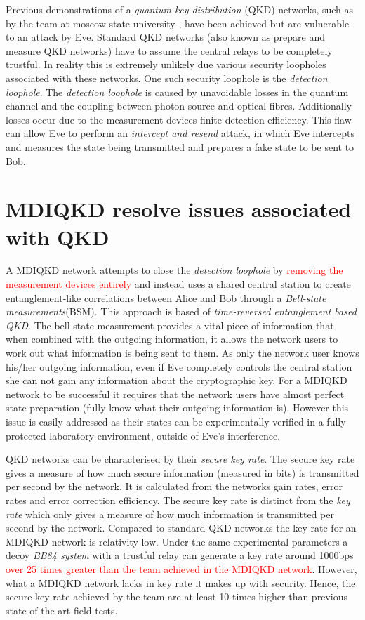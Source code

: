 \documentclass[journal]{vgtc}
\begin{document}
\noindent Previous demonstrations of a \textit{quantum key distribution} (QKD) networks, such as by the team at moscow state university\cite{2017QuEle..47..798K} , have been achieved but are vulnerable to an attack by Eve. Standard QKD networks (also known as prepare and measure QKD networks) have to assume the central relays to be completely trustful. In reality this is extremely unlikely due various security loopholes associated with these networks. One such security loophole is the \textit{detection loophole}. The \textit{detection loophole} is caused by unavoidable losses in the quantum channel and  the coupling between photon source and optical fibres. Additionally losses occur due to the measurement devices finite detection efficiency. This flaw can allow Eve to perform an \textit{intercept and resend} attack, in which Eve intercepts and measures the state being transmitted and prepares a fake state to be sent to Bob.

\section{MDIQKD resolve issues associated with QKD}


A MDIQKD network attempts to close the \textit{detection loophole} by \textcolor{red}{removing the measurement devices entirely} and instead uses a shared  central station to create entanglement-like correlations between Alice and Bob through a \textit{Bell-state measurements}(BSM). This approach is based of \textit{time-reversed entanglement based QKD}\cite{PhysRevA.54.2651}. The bell state measurement provides a vital piece of information that when combined with the outgoing information, it allows the network users to work out what information is being sent to them. As only the network user knows his/her outgoing information, even if Eve completely controls the central station she can not gain any information about the cryptographic key. For a MDIQKD network to be successful it requires that the network users have almost perfect state preparation (fully know what their outgoing information is). However this issue is easily addressed as their states can be experimentally verified in a fully protected laboratory environment, outside of Eve's interference.  

QKD networks can be characterised by their \textit{secure key rate}.  The secure key rate gives a measure of how much secure information (measured in bits) is transmitted per second by the network. It is calculated from the networks gain rates, error rates and error correction efficiency. The secure key rate is distinct from the \textit{key rate} which only gives a measure of how much information is transmitted per second by the network. Compared to standard QKD networks the key rate for an MDIQKD network is relativity low. Under the same experimental parameters a decoy \textit{BB84 system} with a trustful relay can generate a key rate around 1000bps \textcolor{red}{over 25 times greater than the team achieved in the MDIQKD network}. However, what a MDIQKD network lacks in key rate it makes up with security. Hence, the secure key rate achieved by the team are at least 10 times higher than previous state of the art field tests.
\end{document}
